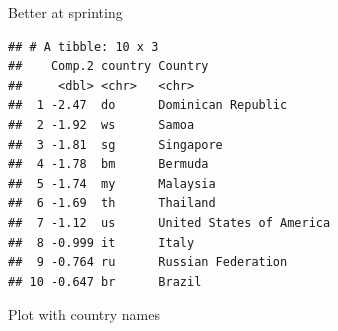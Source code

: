 \documentclass[
  ignorenonframetext,
]{beamer}
\newenvironment{Shaded}{\begin{snugshade}}{\end{snugshade}}
\newcommand{\DataTypeTok}[1]{\textcolor[rgb]{0.13,0.29,0.53}{#1}}
\newcommand{\DecValTok}[1]{\textcolor[rgb]{0.00,0.00,0.81}{#1}}
\newcommand{\FloatTok}[1]{\textcolor[rgb]{0.00,0.00,0.81}{#1}}
\newcommand{\KeywordTok}[1]{\textcolor[rgb]{0.13,0.29,0.53}{\textbf{#1}}}
\newcommand{\NormalTok}[1]{#1}
\newcommand{\OperatorTok}[1]{\textcolor[rgb]{0.81,0.36,0.00}{\textbf{#1}}}
\newcommand{\StringTok}[1]{\textcolor[rgb]{0.31,0.60,0.02}{#1}}
\begin{document}
\begin{frame}[fragile]{Better at sprinting}
\protect\hypertarget{better-at-sprinting}{}

\footnotesize

\begin{Shaded}
\end{Shaded}

\begin{verbatim}
## # A tibble: 10 x 3
##    Comp.2 country Country                 
##     <dbl> <chr>   <chr>                   
##  1 -2.47  do      Dominican Republic      
##  2 -1.92  ws      Samoa                   
##  3 -1.81  sg      Singapore               
##  4 -1.78  bm      Bermuda                 
##  5 -1.74  my      Malaysia                
##  6 -1.69  th      Thailand                
##  7 -1.12  us      United States of America
##  8 -0.999 it      Italy                   
##  9 -0.764 ru      Russian Federation      
## 10 -0.647 br      Brazil
\end{verbatim}

\normalsize

\end{frame}

\begin{frame}[fragile]{Plot with country names}
\protect\hypertarget{plot-with-country-names}{}

\begin{Shaded}
\end{Shaded}

\end{frame}
\end{document}
